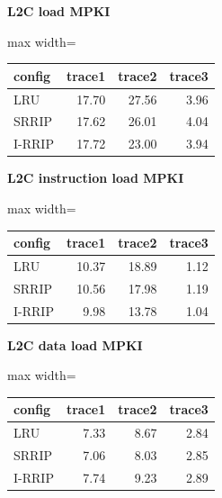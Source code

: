 \documentclass[10pt]{article}
\begin{document}
\begin{center}
\begin{minipage}[t]{0.48\linewidth}\centering
\textbf{L2C load MPKI}\\[3pt]
\begin{adjustbox}{max width=\linewidth}
\begin{tabular}{@{}lrrr@{}}
\toprule
\textbf{config} & \textbf{trace1} & \textbf{trace2} & \textbf{trace3} \\
\midrule
LRU & 17.70 & 27.56 & 3.96 \\
SRRIP & 17.62 & 26.01 & 4.04 \\
I-RRIP & 17.72 & 23.00 & 3.94 \\
\bottomrule
\end{tabular}
\end{adjustbox}
\end{minipage}\hfill
\begin{minipage}[t]{0.48\linewidth}\centering
\textbf{L2C instruction load MPKI}\\[3pt]
\begin{adjustbox}{max width=\linewidth}
\begin{tabular}{@{}lrrr@{}}
\toprule
\textbf{config} & \textbf{trace1} & \textbf{trace2} & \textbf{trace3} \\
\midrule
LRU & 10.37 & 18.89 & 1.12 \\
SRRIP & 10.56 & 17.98 & 1.19 \\
I-RRIP & 9.98 & 13.78 & 1.04 \\
\bottomrule
\end{tabular}
\end{adjustbox}
\end{minipage}
\end{center}
\medskip
\begin{center}
\begin{minipage}[t]{0.48\linewidth}\centering
\textbf{L2C data load MPKI}\\[3pt]
\begin{adjustbox}{max width=\linewidth}
\begin{tabular}{@{}lrrr@{}}
\toprule
\textbf{config} & \textbf{trace1} & \textbf{trace2} & \textbf{trace3} \\
\midrule
LRU & 7.33 & 8.67 & 2.84 \\
SRRIP & 7.06 & 8.03 & 2.85 \\
I-RRIP & 7.74 & 9.23 & 2.89 \\
\bottomrule
\end{tabular}
\end{adjustbox}
\end{minipage}
\end{center}
\end{document}
